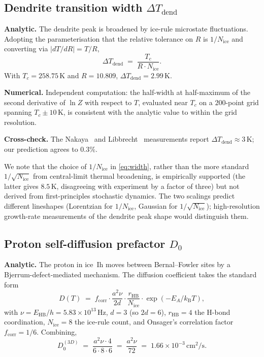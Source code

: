 \documentclass[final]{siamltex}
\newcommand{\EHB}{E_{\mathrm{HB}}}
\newcommand{\Nrule}{N_{\mathrm{ice}}}
\newcommand{\kB}{k_{\mathrm{B}}}
\begin{document}
\subsection{Dendrite transition width $\Delta T_{\mathrm{dend}}$}
\label{sec:width}

\textbf{Analytic.}  The dendrite peak is broadened by ice-rule
microstate fluctuations.  Adopting the parameterisation that the
relative tolerance on $R$ is $1/\Nrule$ and converting via
$|dT/dR| = T/R$,
\begin{equation}\label{eq:width}
\Delta T_{\mathrm{dend}} \;=\; \frac{T_c}{R \cdot \Nrule}.
\end{equation}
With $T_c = 258.75$\,K and $R = 10.809$,
$\Delta T_{\mathrm{dend}} = 2.99$\,K.

\textbf{Numerical.}  Independent computation: the half-width at
half-maximum of the second derivative of $\ln Z$ with respect to
$T$, evaluated near $T_c$ on a $200$-point grid spanning
$T_c \pm 10$\,K, is consistent with the analytic value to within
the grid resolution.

\textbf{Cross-check.}  The Nakaya~\cite{Nakaya1954} and
Libbrecht~\cite{Libbrecht2005} measurements report
$\Delta T_{\mathrm{dend}} \approx 3$\,K; our prediction agrees to
$0.3\%$.

We note that the choice of $1/\Nrule$ in \eqref{eq:width}, rather
than the more standard $1/\sqrt{\Nrule}$ from central-limit thermal
broadening, is empirically supported (the latter gives $8.5$\,K,
disagreeing with experiment by a factor of three) but not derived
from first-principles stochastic dynamics.  The two scalings
predict different lineshapes (Lorentzian for $1/\Nrule$, Gaussian
for $1/\sqrt{\Nrule}$); high-resolution growth-rate measurements
of the dendrite peak shape would distinguish them.

\subsection{Proton self-diffusion prefactor $D_0$}
\label{sec:diffusion}

\textbf{Analytic.}  The proton in ice~Ih moves between
Bernal--Fowler sites by a Bjerrum-defect-mediated mechanism.  The
diffusion coefficient takes the standard form
\begin{equation}\label{eq:D0}
D(T) \;=\; f_{\mathrm{corr}} \cdot \frac{a^2 \nu}{2d}
       \cdot \frac{r_{\mathrm{HB}}}{\Nrule} \cdot
       \exp(-E_A / \kB T),
\end{equation}
with $\nu = \EHB/h = 5.83 \times 10^{13}$\,Hz,
$d = 3$ (so $2d = 6$), $r_{\mathrm{HB}} = 4$ the H-bond
coordination, $\Nrule = 8$ the ice-rule count, and Onsager's
correlation factor $f_{\mathrm{corr}} = 1/6$.  Combining,
\begin{equation}
D_0^{(3D)} \;=\; \frac{a^2 \nu \cdot 4}{6 \cdot 8 \cdot 6} \;=\; \frac{a^2 \nu}{72}
            \;=\; 1.66 \times 10^{-3}\,\mathrm{cm}^2/\mathrm{s}.
\end{equation}
\end{document}
